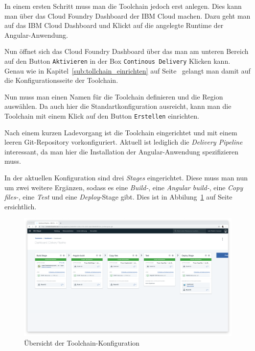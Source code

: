 In einem ersten Schritt muss man die Toolchain jedoch erst anlegen. Dies kann man über das Cloud Foundry Dashboard der
IBM Cloud machen. Dazu geht man auf das IBM Cloud Dashboard und Klickt auf die angelegte Runtime der Angular-Anwendung.

Nun öffnet sich das Cloud Foundry Dashboard über das man am unteren Bereich auf den Button \texttt{Aktivieren} in der
Box \texttt{Continous Delivery} Klicken kann. Genau wie in Kapitel~\ref{sub:tollchain_einrichten} auf
Seite~\pageref{sub:tollchain_einrichten} gelangt man damit auf die Konfigurationsseite der Toolchain.

Nun muss man einen Namen für die Toolchain definieren und die Region auswählen. Da auch hier die Standartkonfiguration
ausreicht, kann man die Toolchain mit einem Klick auf den Button \texttt{Erstellen} einrichten.

Nach einem kurzen Ladevorgang ist die Toolchain eingerichtet und mit einem leeren Git-Repository vorkonfiguriert.
Aktuell ist lediglich die \textit{Delivery Pipeline} interessant, da man hier die Installation der Angular-Anwendung
spezifizieren muss.

In der aktuellen Konfiguration sind drei \textit{Stages} eingerichtet. Diese muss man nun um zwei weitere Ergänzen,
sodass es eine \textit{Build-}, eine \textit{Angular build-}, eine \textit{Copy files-}, eine \textit{Test} und eine
\textit{Deploy}-Stage gibt. Dies ist in Abbilung~\ref{fig:umsetzung_toolchain_pipeline_frontend} auf
Seite~\pageref{fig:umsetzung_toolchain_pipeline_frontend} ersichtlich.

\begin{figure}[h]
    \centering
    \includegraphics[width=\textwidth]{images/kapitel_4/toolchain_pipeline.png}
    \caption{Übersicht der Toolchain-Konfiguration}
    \label{fig:umsetzung_toolchain_pipeline_frontend}
\end{figure}

